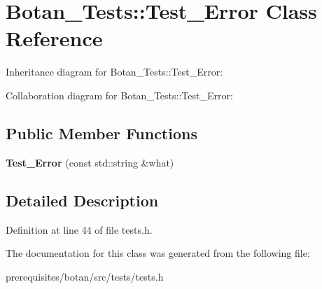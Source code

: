 \hypertarget{class_botan___tests_1_1_test___error}{}\section{Botan\+\_\+\+Tests\+:\+:Test\+\_\+\+Error Class Reference}
\label{class_botan___tests_1_1_test___error}


Inheritance diagram for Botan\+\_\+\+Tests\+:\+:Test\+\_\+\+Error\+:


Collaboration diagram for Botan\+\_\+\+Tests\+:\+:Test\+\_\+\+Error\+:
\subsection*{Public Member Functions}
\begin{DoxyCompactItemize}
\item 
\mbox{\label{class_botan___tests_1_1_test___error_aea48962b0947fb341887f45ed67154b2}} 
{\bfseries Test\+\_\+\+Error} (const std\+::string \&what)
\end{DoxyCompactItemize}


\subsection{Detailed Description}


Definition at line 44 of file tests.\+h.



The documentation for this class was generated from the following file\+:\begin{DoxyCompactItemize}
\item 
prerequisites/botan/src/tests/tests.\+h\end{DoxyCompactItemize}
